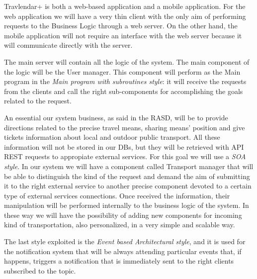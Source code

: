 Travlendar+ is both a web-based application and a mobile application. For the web application we will have a very thin client with the only aim of performing requests to the Business Logic through a web server.
On the other hand, the mobile application will not require an interface with the web server because it will communicate directly with the server.
\\\par
The main server will contain all the logic of the system. The main component of the logic will be the User manager. This component will perform as the Main program in the \emph{Main program with subroutines style}: it will receive the requests from the clients and call the right sub-components for accomplishing the goals related to the request.
\\\par
An essential our system business, as said in the RASD, will be to provide directions related to the precise travel means, sharing means’ position and give tickets information about local and outdoor public transport. All these information will not be stored in our DBs, but they will be retrieved with API REST requests to appropiate external services. For this goal we will use a \emph{SOA style}. 
In our system we will have a component called Transport manager that will be able to distinguish the kind of the request and demand the aim of submitting it to the right external service to another precise component devoted to a certain type of external services connections. Once received the information, their manipulation will be performed internally to the business logic of the system. In these way we will have the possibility of adding new components for incoming kind of transportation, also personalized, in a very simple and scalable way.
\\\par
The last style exploited is the \emph{Event based Architectural style}, and it is used for the notification system that will be always attending particular events that, if happens, triggers a notification that is immediately sent to the right clients subscribed to the topic. 


